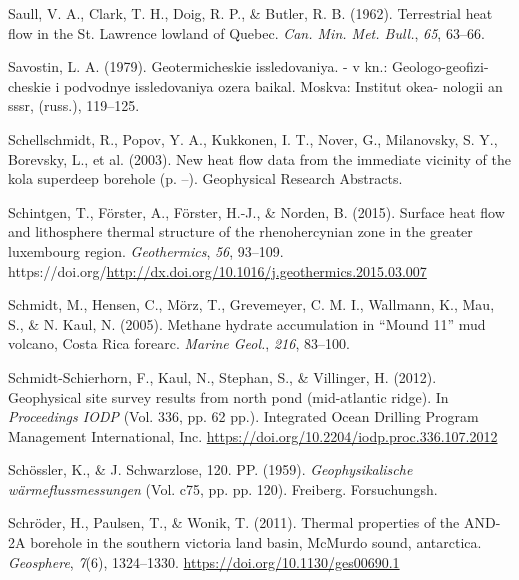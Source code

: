 \begin{CSLReferences}{1}{1}
\leavevmode{}%
Saull, V. A., Clark, T. H., Doig, R. P., \& Butler, R. B. (1962). Terrestrial heat flow in the {St. Lawrence} lowland of {Quebec}. \emph{Can. Min. Met. Bull.}, \emph{65}, 63--66.

\leavevmode{}%
Savostin, L. A. (1979). Geotermicheskie issledovaniya. - v kn.: Geologo-geofizi- cheskie i podvodnye issledovaniya ozera baikal. Moskva: Institut okea- nologii an sssr, (russ.), 119--125.

\leavevmode{}%
Schellschmidt, R., Popov, Y. A., Kukkonen, I. T., Nover, G., Milanovsky, S. Y., Borevsky, L., et al. (2003). New heat flow data from the immediate vicinity of the kola superdeep borehole (p. --). Geophysical Research Abstracts.

\leavevmode{}%
Schintgen, T., Förster, A., Förster, H.-J., \& Norden, B. (2015). Surface heat flow and lithosphere thermal structure of the rhenohercynian zone in the greater luxembourg region. \emph{Geothermics}, \emph{56}, 93--109. https://doi.org/\url{http://dx.doi.org/10.1016/j.geothermics.2015.03.007}

\leavevmode{}%
Schmidt, M., Hensen, C., Mörz, T., Grevemeyer, C. M. I., Wallmann, K., Mau, S., \& N. Kaul, N. (2005). Methane hydrate accumulation in {{``Mound 11''}} mud volcano, {Costa Rica forearc}. \emph{Marine Geol.}, \emph{216}, 83--100.

\leavevmode{}%
Schmidt-Schierhorn, F., Kaul, N., Stephan, S., \& Villinger, H. (2012). Geophysical site survey results from north pond (mid-atlantic ridge). In \emph{Proceedings IODP} (Vol. 336, pp. 62 pp.). Integrated Ocean Drilling Program Management International, Inc. \url{https://doi.org/10.2204/iodp.proc.336.107.2012}

\leavevmode{}%
Schössler, K., \& J. Schwarzlose, 120. PP. (1959). \emph{Geophysikalische wärmeflussmessungen} (Vol. c75, pp. pp. 120). Freiberg. Forsuchungsh.

\leavevmode{}%
Schröder, H., Paulsen, T., \& Wonik, T. (2011). Thermal properties of the AND-2A borehole in the southern victoria land basin, McMurdo sound, antarctica. \emph{Geosphere}, \emph{7}(6), 1324--1330. \url{https://doi.org/10.1130/ges00690.1}


\end{CSLReferences}
